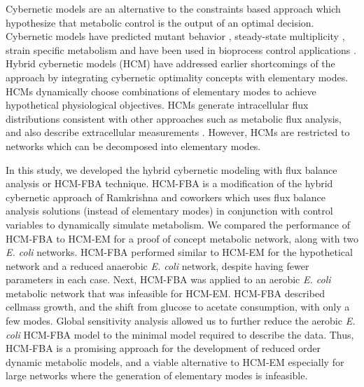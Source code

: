 \documentclass[10pt,twocolumn,twoside,final]{IEEEtran}
\begin{document}
Cybernetic models are an alternative to the constraints based approach which hypothesize that metabolic control is the output of an optimal decision.
Cybernetic models have predicted mutant behavior \cite{1999_varner_ramkrishna_MetaEng,Song:2012aa}, steady-state multiplicity \cite{2012_kim_ramkrishna_BiotechProg}, strain specific metabolism \cite{Song:2011aa} and have been used in bioprocess control applications \cite{Gadkar:2003aa}.
Hybrid cybernetic models (HCM) have addressed earlier shortcomings of the approach by integrating cybernetic optimality concepts with elementary modes.
HCMs dynamically choose combinations of elementary modes to achieve hypothetical physiological objectives.
HCMs generate intracellular flux distributions consistent with other approaches such as metabolic flux analysis, and also describe extracellular measurements \cite{2008_kim_varner_ramkrishna_BiotechProg}. However, HCMs are restricted to networks which can be decomposed into elementary modes.


In this study, we developed the hybrid cybernetic modeling with flux balance analysis or HCM-FBA technique.
HCM-FBA is a modification of the hybrid cybernetic approach of Ramkrishna and coworkers which uses flux balance analysis solutions
(instead of elementary modes) in conjunction with control variables to dynamically simulate metabolism.
We compared the performance of HCM-FBA to HCM-EM for a proof of concept metabolic network, along with two \emph{E. coli} networks.
HCM-FBA performed similar to HCM-EM for the hypothetical network and a reduced anaerobic \textit{E. coli} network, despite having fewer parameters in each case.
Next, HCM-FBA was applied to an aerobic \textit{E. coli} metabolic network that was infeasible for HCM-EM.
HCM-FBA described cellmass growth, and the shift from glucose to acetate consumption, with only a few modes.
Global sensitivity analysis allowed us to further reduce the aerobic \textit{E. coli} HCM-FBA model to the minimal model required to describe the data.
Thus, HCM-FBA is a promising approach for the development of reduced order dynamic metabolic models,
and a viable alternative to HCM-EM especially for large networks where the generation of elementary modes is infeasible.
\end{document}
